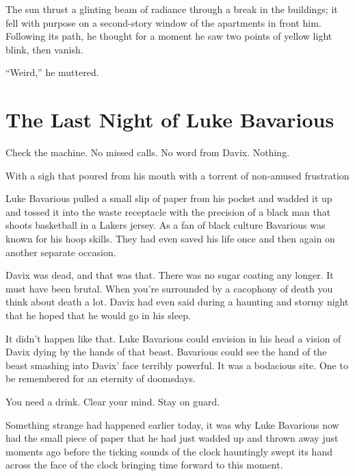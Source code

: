The sun thrust a glinting beam of radiance through a break in the
buildings; it fell with purpose on a second-story window of the
apartments in front him. Following its path, he thought for a
moment he saw two points of yellow light blink, then vanish.



``Weird,'' he muttered. 
 



\chapter{The Last Night of Luke Bavarious}







Check the machine. No missed calls. No word from Davix.
Nothing.



With a sigh that poured from his mouth with a torrent of non-amused
frustration

Luke Bavarious pulled a small slip of paper from his pocket and
wadded it up and tossed it into the waste receptacle with the
precision of a black man that shoots basketball in a Lakers jersey.
As a fan of black culture Bavarious was known for his hoop skills.
They had even saved his life once and then again on another
separate occasion.



Davix was dead, and that was that. There was no sugar coating any
longer. It must have been brutal. When you're surrounded by a
cacophony of death you think about death a lot. Davix had even said
during a haunting and stormy night that he hoped that he would go
in his sleep.



It didn't happen like that. Luke Bavarious could envision in
his head a vision of Davix dying by the hands of that beast.
Bavarious could see the hand of the beast smashing into
Davix' face terribly powerful. It was a bodacious site. One
to be remembered for an eternity of doomsdays.



You need a drink. Clear your mind. Stay on guard.



Something strange had happened earlier today, it was why Luke
Bavarious now had the small piece of paper that he had just wadded
up and thrown away just moments ago before the ticking sounds of
the clock hauntingly swept its hand across the face of the clock
bringing time forward to this moment.



